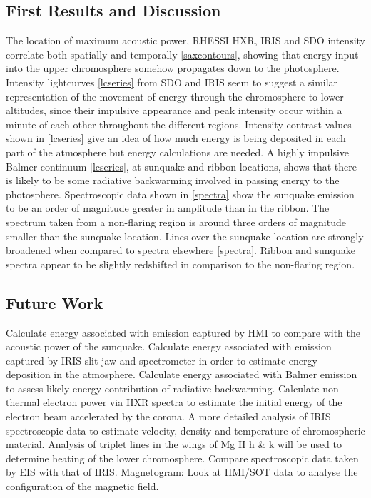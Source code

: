 \documentclass[11pt]{article}
\begin{document}
\subsection{First Results and Discussion}
The location of maximum acoustic power, RHESSI HXR, IRIS and SDO intensity correlate both spatially and temporally \ref{saxcontours}, showing that energy input into the upper chromosphere somehow propagates down to the photosphere. Intensity lightcurves \ref{lcseries} from SDO and IRIS seem to suggest a similar representation of the movement of energy through the chromosphere to lower altitudes, since their impulsive appearance and peak intensity occur within a minute of each 
other throughout the different regions. Intensity contrast values shown in \ref{lcseries} give an idea of how much energy is being deposited in each part of the atmosphere but energy calculations are needed. A highly impulsive Balmer continuum \ref{lcseries}, at sunquake and ribbon locations, shows that there is likely to be some radiative backwarming involved in passing energy to the photosphere. Spectroscopic data shown in \ref{spectra} show the sunquake emission to be an order of magnitude greater in amplitude than in the ribbon. The spectrum taken from a non-flaring region is around three orders of magnitude smaller than the sunquake location. Lines over the sunquake location are strongly broadened when compared to spectra elsewhere \ref{spectra}. Ribbon and sunquake spectra appear to be slightly redshifted in comparison to the non-flaring region.\\


\subsection{Future Work}
Calculate energy associated with emission captured by HMI to compare with the acoustic power of the sunquake. Calculate energy associated with emission captured by IRIS slit jaw and spectrometer in order to estimate energy deposition in the atmosphere. Calculate energy associated with Balmer emission to assess likely energy contribution of radiative backwarming. Calculate non-thermal electron power via HXR spectra to estimate the initial energy of the electron beam accelerated by the corona. A more detailed analysis of IRIS spectroscopic data to estimate velocity, density and temperature of chromospheric material. Analysis of triplet lines in the wings of Mg II h \& k will be used to determine heating of the lower chromosphere. Compare spectroscopic data taken by EIS with that of IRIS. Magnetogram: Look at HMI/SOT data to analyse the configuration of the magnetic field.\\
\end{document}
